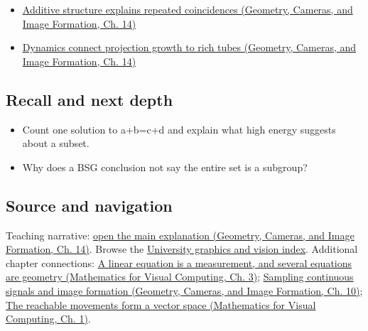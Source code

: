 \hypertarget{appendix-b0732b22e7d6-full-teaching-explanation}{}

\begin{itemize}
\tightlist
\item
  \href{../03-Geometry-Cameras-and-Image-Formation/main.pdf\#nameddest=04-visual-computing-ii-ch033-additive-structure-explains-repeated-coincidences}{Additive structure explains repeated coincidences (Geometry, Cameras, and Image Formation, Ch. 14)}
\item
  \href{../03-Geometry-Cameras-and-Image-Formation/main.pdf\#nameddest=04-visual-computing-ii-ch033-dynamics-connect-projection-growth-to-rich-tubes}{Dynamics connect projection growth to rich tubes (Geometry, Cameras, and Image Formation, Ch. 14)}
\end{itemize}

\subsection{Recall and next depth}\label{appendix-b0732b22e7d6-recall-and-next-depth}

\hypertarget{appendix-b0732b22e7d6-recall-and-next-depth}{}

\begin{itemize}
\tightlist
\item
  Count one solution to a+b=c+d and explain what high energy suggests about a subset.
\item
  Why does a BSG conclusion not say the entire set is a subgroup?
\end{itemize}

\subsection{Source and navigation}\label{appendix-b0732b22e7d6-source-and-navigation}

\hypertarget{appendix-b0732b22e7d6-source-and-navigation}{}

Teaching narrative: \href{../03-Geometry-Cameras-and-Image-Formation/main.pdf\#nameddest=04-visual-computing-ii-ch033-additive-structure-explains-repeated-coincidences}{open the main explanation (Geometry, Cameras, and Image Formation, Ch. 14)}. Browse the \hyperref[appendix-a6d556a4ef50-university-graphics-vision-and-photography---independent-series]{University graphics and vision index}. Additional chapter connections: \href{../02-Mathematics-for-Visual-Computing/main.pdf\#nameddest=01-foundations-i-ch019-a-linear-equation-is-a-measurement-and-several-equations-are-geometry}{A linear equation is a measurement, and several equations are geometry (Mathematics for Visual Computing, Ch. 3)}; \href{../03-Geometry-Cameras-and-Image-Formation/main.pdf\#nameddest=03-visual-computing-i-ch003-sampling-continuous-signals-and-image-formation}{Sampling continuous signals and image formation (Geometry, Cameras, and Image Formation, Ch. 10)}; \href{../02-Mathematics-for-Visual-Computing/main.pdf\#nameddest=01-foundations-i-ch017-the-reachable-movements-form-a-vector-space}{The reachable movements form a vector space (Mathematics for Visual Computing, Ch. 1)}.

